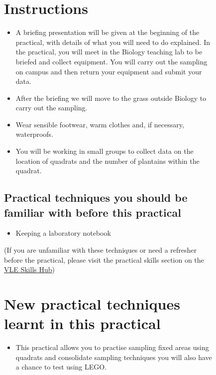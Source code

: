\documentclass[
  letterpaper,
  DIV=11,
  numbers=noendperiod]{scrreprt}
\providecommand{\tightlist}{%
  \setlength{\itemsep}{0pt}\setlength{\parskip}{0pt}}
\begin{document}
\begin{figure}
{\section{Instructions}\label{instructions}

\begin{itemize}
\tightlist
\item
  A briefing presentation will be given at the beginning of the
  practical, with details of what you will need to do explained. In the
  practical, you will meet in the Biology teaching lab to be briefed and
  collect equipment. You will carry out the sampling on campus and then
  return your equipment and submit your data.
\item
  After the briefing we will move to the grass outside Biology to carry
  out the sampling.
\item
  Wear sensible footwear, warm clothes and, if necessary, waterproofs.
\item
  You will be working in small groups to collect data on the location of
  quadrats and the number of plantains within the quadrat.
\end{itemize}

\subsection{Practical techniques you should be familiar with before this
practical}\label{practical-techniques-you-should-be-familiar-with-before-this-practical}

\begin{itemize}
\tightlist
\item
  Keeping a laboratory notebook
\end{itemize}

(If you are unfamiliar with these techniques or need a refresher before
the practical, please visit the practical skills section on the
\href{https://xerte.york.ac.uk/play.php?template_id=4175\#page1}{VLE
Skills Hub})

\section{New practical techniques learnt in this
practical}\label{new-practical-techniques-learnt-in-this-practical}

\begin{itemize}
\tightlist
\item
  This practical allows you to practise sampling fixed areas using
  quadrats and consolidate sampling techniques you will also have a
  chance to test using LEGO.
\end{itemize}

}
\end{figure}
\end{document}
